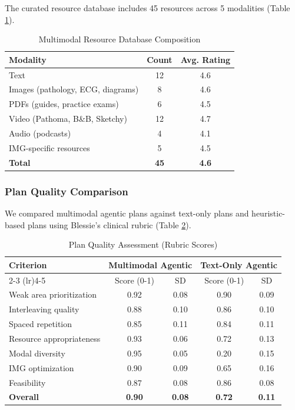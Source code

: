 The curated resource database includes 45 resources across 5 modalities (Table \ref{tab:resource_db}).

\begin{table}[H]
\centering
\caption{Multimodal Resource Database Composition}
\label{tab:resource_db}
\begin{tabular}{lcc}
\toprule
\textbf{Modality} & \textbf{Count} & \textbf{Avg. Rating} \\
\midrule
Text & 12 & 4.6 \\
Images (pathology, ECG, diagrams) & 8 & 4.6 \\
PDFs (guides, practice exams) & 6 & 4.5 \\
Video (Pathoma, B\&B, Sketchy) & 12 & 4.7 \\
Audio (podcasts) & 4 & 4.1 \\
IMG-specific resources & 5 & 4.5 \\
\midrule
\textbf{Total} & \textbf{45} & \textbf{4.6} \\
\bottomrule
\end{tabular}
\end{table}

\subsubsection{Plan Quality Comparison}

We compared multimodal agentic plans against text-only plans and heuristic-based plans using Blessie's clinical rubric (Table \ref{tab:plan_quality}).

\begin{table}[H]
\centering
\caption{Plan Quality Assessment (Rubric Scores)}
\label{tab:plan_quality}
\begin{tabular}{lcccc}
\toprule
\textbf{Criterion} & \multicolumn{2}{c}{\textbf{Multimodal Agentic}} & \multicolumn{2}{c}{\textbf{Text-Only Agentic}} \\
\cmidrule(lr){2-3} \cmidrule(lr){4-5}
 & Score (0-1) & SD & Score (0-1) & SD \\
\midrule
Weak area prioritization & 0.92 & 0.08 & 0.90 & 0.09 \\
Interleaving quality & 0.88 & 0.10 & 0.86 & 0.10 \\
Spaced repetition & 0.85 & 0.11 & 0.84 & 0.11 \\
Resource appropriateness & 0.93 & 0.06 & 0.72 & 0.13 \\
Modal diversity & 0.95 & 0.05 & 0.20 & 0.15 \\
IMG optimization & 0.90 & 0.09 & 0.65 & 0.16 \\
Feasibility & 0.87 & 0.08 & 0.86 & 0.08 \\
\midrule
\textbf{Overall} & \textbf{0.90} & \textbf{0.08} & \textbf{0.72} & \textbf{0.11} \\
\bottomrule
\end{tabular}
\end{table}

